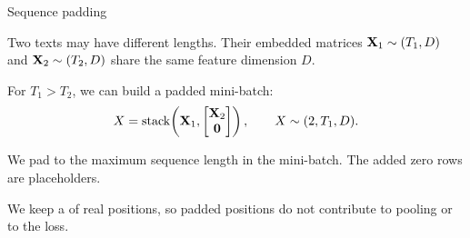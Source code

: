\begin{frame}{Sequence padding}
    \setlength{\parskip}{4pt}
    \setlength{\abovedisplayskip}{7pt}
    \setlength{\belowdisplayskip}{7pt}

    Two texts may have different lengths. Their embedded matrices
    $\boldsymbol{\mathbf{X}}_1\sim(T_1,D)$ and $\boldsymbol{\mathbf{X}}_2\sim(T_2,D)$ share the same feature dimension $D$.

    For $T_1>T_2$, we can build a padded mini-batch:
    \[
        X=\operatorname{stack}\!\left(
        \boldsymbol{\mathbf{X}}_1,\begin{bmatrix}\boldsymbol{\mathbf{X}}_2\\\boldsymbol{\mathbf{0}}\end{bmatrix}
        \right),
        \qquad X\sim(2,T_1,D).
    \]

    We pad to the maximum sequence length in the mini-batch.
    The added zero rows are placeholders.

    We keep a  of real positions, so padded positions
    do not contribute to pooling or to the loss.

\end{frame}


